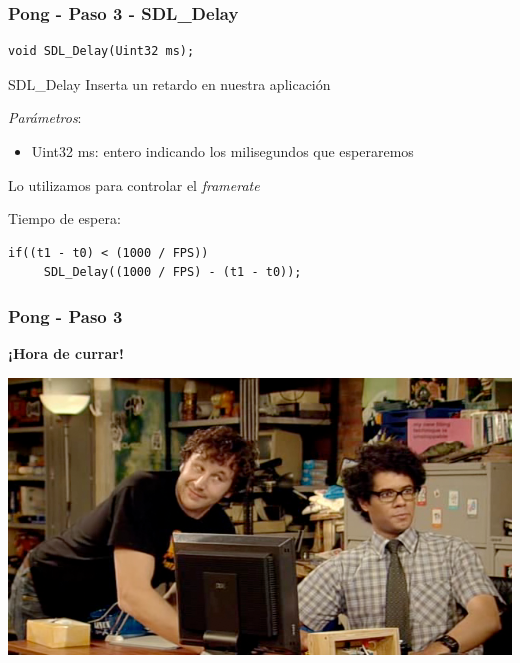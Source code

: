 \begin{frame}[fragile]
    \frametitle{Pong - Paso 3 - SDL\_Delay}
	
\begin{verbatim}
void SDL_Delay(Uint32 ms);
\end{verbatim}

    \begin{block}{SDL\_Delay}
	Inserta un retardo en nuestra aplicación
	
	\emph{Parámetros}:
	\begin{itemize}
	    \item Uint32 ms: entero indicando los milisegundos que esperaremos
	\end{itemize}
	
	Lo utilizamos para controlar el \emph{framerate}
    \end{block}
    
    Tiempo de espera:
\begin{verbatim}
if((t1 - t0) < (1000 / FPS))
     SDL_Delay((1000 / FPS) - (t1 - t0));
\end{verbatim}

\end{frame}


\begin{frame}
	\frametitle{Pong - Paso 3}
	
    \begin{center}
        \textbf{¡Hora de currar!}
    \end{center}
	
    \begin{center}
		\includegraphics[scale=0.4]{img/currar-6.png}
	\end{center}	

\end{frame}

